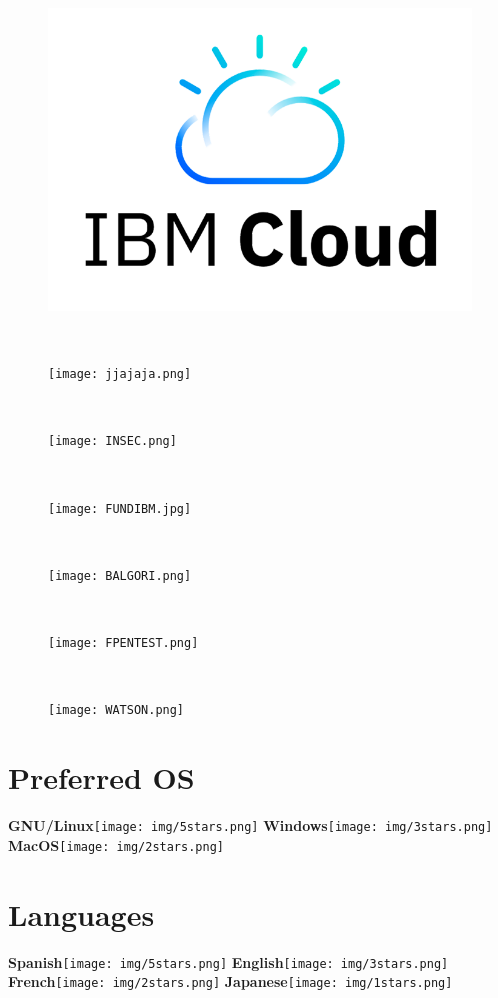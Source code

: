 \documentclass[]{friggeri-cv}
\begin{document}
\begin{aside}
     \begin{figure}
        \centering
     \includegraphics[width=.7\textwidth,center]{ibm.png}
    \end{figure}
    ~
     \begin{figure}
        \centering
     \texttt{[image: jjajaja.png]}
    \end{figure}
    ~
    \begin{figure}
        \centering
     \texttt{[image: INSEC.png]}
    \end{figure}
    ~
     \begin{figure}
        \centering
     \texttt{[image: FUNDIBM.jpg]}
    \end{figure}
      ~
     \begin{figure}
        \centering
     \texttt{[image: BALGORI.png]}
    \end{figure}
      ~
     \begin{figure}
        \centering
     \texttt{[image: FPENTEST.png]}
    \end{figure}
      ~
    \begin{figure}
        \centering
     \texttt{[image: WATSON.png]}
    \end{figure}
    
     \section{Preferred OS}
    \textbf{GNU/Linux}\texttt{[image: img/5stars.png]}
    \textbf{Windows}\texttt{[image: img/3stars.png]}
    \textbf{MacOS}\texttt{[image: img/2stars.png]}
    ~
  \section{Languages}
    \textbf{Spanish}\texttt{[image: img/5stars.png]}
    \textbf{English}\texttt{[image: img/3stars.png]}
    \textbf{French}\texttt{[image: img/2stars.png]}
    \textbf{Japanese}\texttt{[image: img/1stars.png]}
    

\end{aside}
\end{document}
